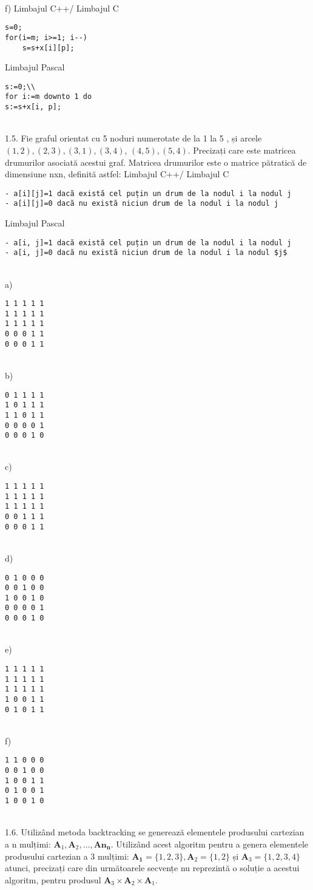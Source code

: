 \\
f) Limbajul C++/ Limbajul C
\begin{verbatim}
s=0;
for(i=m; i>=1; i--)
    s=s+x[i][p];
\end{verbatim}
Limbajul Pascal
\begin{verbatim}
s:=0;\\
for i:=m downto 1 do
s:=s+x[i, p];
\end{verbatim}
\\
1.5. Fie graful orientat cu 5 noduri numerotate de la 1 la 5 , și arcele $(1,2),(2,3),(3,1),(3,4)$, $(4,5),(5,4)$. Precizați care este matricea drumurilor asociată acestui graf. Matricea drumurilor este o matrice pătratică de dimensiune nxn, definită astfel:
Limbajul C++/ Limbajul C
\begin{verbatim}
- a[i][j]=1 dacă există cel puțin un drum de la nodul i la nodul j
- a[i][j]=0 dacă nu există niciun drum de la nodul i la nodul j
\end{verbatim}
Limbajul Pascal
\begin{verbatim}
- a[i, j]=1 dacă există cel puțin un drum de la nodul i la nodul j
- a[i, j]=0 dacă nu există niciun drum de la nodul i la nodul $j$
\end{verbatim}
\\
a) \begin{verbatim}
1 1 1 1 1
1 1 1 1 1
1 1 1 1 1
0 0 0 1 1
0 0 0 1 1
\end{verbatim}
\\
b) \begin{verbatim}
0 1 1 1 1
1 0 1 1 1
1 1 0 1 1
0 0 0 0 1
0 0 0 1 0
\end{verbatim}
\\
c) \begin{verbatim}
1 1 1 1 1
1 1 1 1 1
1 1 1 1 1
0 0 1 1 1
0 0 0 1 1
\end{verbatim}
\\
d) \begin{verbatim}
0 1 0 0 0
0 0 1 0 0
1 0 0 1 0
0 0 0 0 1
0 0 0 1 0
\end{verbatim}
\\
e) \begin{verbatim}
1 1 1 1 1
1 1 1 1 1
1 1 1 1 1
1 0 0 1 1
0 1 0 1 1
\end{verbatim}
\\
f) \begin{verbatim}
1 1 0 0 0
0 0 1 0 0
1 0 0 1 1
0 1 0 0 1
1 0 0 1 0
\end{verbatim}
\\
1.6. Utilizând metoda backtracking se generează elementele produsului cartezian a n mulțimi: $\mathbf{A}_{1}, \mathbf{A}_{2}, \ldots, \mathbf{A n}_{\mathbf{n}}$. Utilizând acest algoritm pentru a genera elementele produsului cartezian a 3 mulțimi: $\mathbf{A}_{\mathbf{1}}=\{1,2,3\}, \mathbf{A}_{2}=\{1,2\}$ și $\mathbf{A}_{3}=\{1,2,3,4\}$ atunci, precizați care din următoarele secvențe nu reprezintă o soluție a acestui algoritm, pentru produsul $\mathbf{A}_{3} \times \mathbf{A}_{2} \times \mathbf{A}_{1}$.
